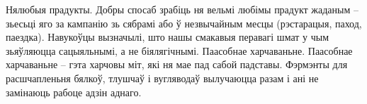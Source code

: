 Нялюбыя прадукты.
Добры спосаб зрабіць ня вельмі любімы прадукт жаданым – зьесьці яго за кампанію зь сябрамі або ў незвычайным месцы (рэстарацыя, паход, паездка). Навукоўцы вызначылі, што нашы смакавыя перавагі шмат у чым зьяўляюцца сацыяльнымі, а не біялягічнымі.
Паасобнае харчаваньне.
Паасобнае харчаваньне – гэта харчовы міт, які ня мае пад сабой падставы. Фэрмэнты для расшчапленьня бялкоў, тлушчаў і вугляводаў вылучаюцца разам і ані не замінаюць рабоце адзін аднаго.
